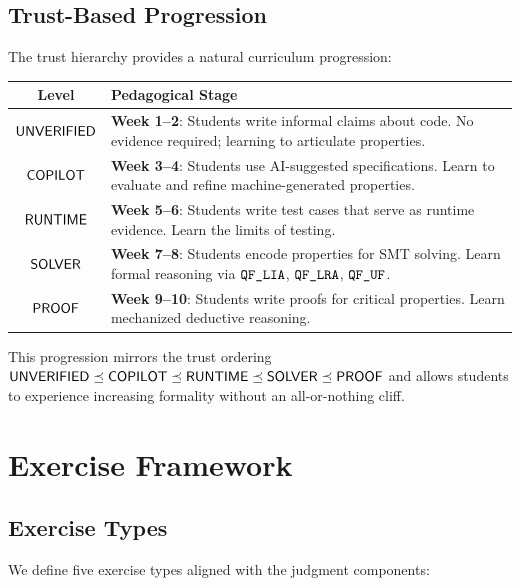 \documentclass[11pt]{article}
\begin{document}
\subsection{Trust-Based Progression}

The trust hierarchy provides a natural curriculum progression:

\begin{center}
\begin{tabular}{cp{8cm}}
\toprule
\textbf{Level} & \textbf{Pedagogical Stage} \\
\midrule
$\mathsf{UNVERIFIED}$ & \textbf{Week 1--2}: Students write informal claims about code.
  No evidence required; learning to articulate properties. \\
$\mathsf{COPILOT}$ & \textbf{Week 3--4}: Students use AI-suggested specifications.
  Learn to evaluate and refine machine-generated properties. \\
$\mathsf{RUNTIME}$ & \textbf{Week 5--6}: Students write test cases that serve as
  runtime evidence. Learn the limits of testing. \\
$\mathsf{SOLVER}$ & \textbf{Week 7--8}: Students encode properties for SMT solving.
  Learn formal reasoning via $\texttt{QF\_LIA}$, $\texttt{QF\_LRA}$, $\texttt{QF\_UF}$. \\
$\mathsf{PROOF}$ & \textbf{Week 9--10}: Students write \LEAN{} proofs for critical
  properties. Learn mechanized deductive reasoning. \\
\bottomrule
\end{tabular}
\end{center}

This progression mirrors the trust ordering
$\mathsf{UNVERIFIED} \preceq \mathsf{COPILOT} \preceq \mathsf{RUNTIME} \preceq \mathsf{SOLVER} \preceq \mathsf{PROOF}$
and allows students to experience increasing formality without an
all-or-nothing cliff.

\section{Exercise Framework}\label{sec:exercises}

\subsection{Exercise Types}

We define five exercise types aligned with the judgment components:
\end{document}
